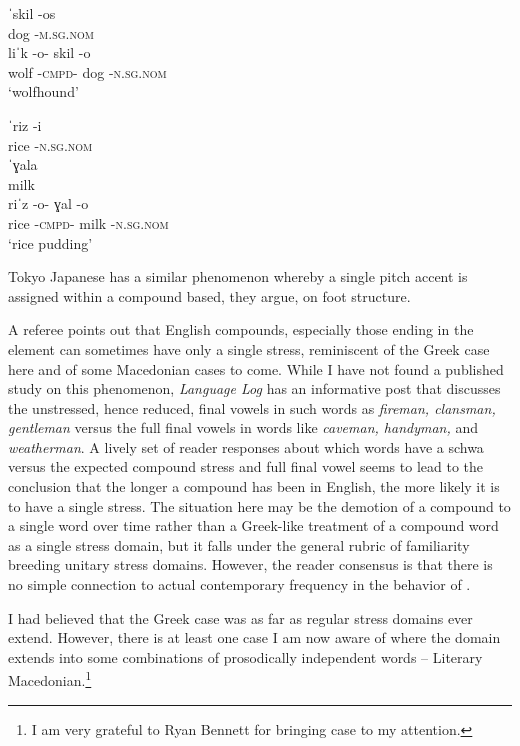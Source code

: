 \documentclass[output=paper,
modfonts
]{LSP/langsci}
\begin{document}
	\ex \gll ˈskil \squish-os\\
	dog \squish-\textsc{m.sg.nom} \\

	\ex \gll liˈk \squish-o- {\squish skil} \squish-o\\
	wolf \squish-\textsc{cmpd-} {\squish dog} \squish\textsc{-n.sg.nom}\\
	\glt ‘wolfhound’

	\ex \gll ˈriz \squish-i \\
	rice \squish-\textsc{n.sg.nom}\\

	\ex \gll ˈɣala\\
	milk \\

	\ex \gll riˈz \squish-o- {\squish ɣal} \squish-o\\
	rice \squish\textsc{-cmpd-} {\squish milk} \squish-\textsc{n.sg.nom} \\
	\glt  ‘rice pudding’
	\z
\z

\noindent Tokyo Japanese \citep{poser1990,kubozono2008} has a similar phenomenon whereby a single pitch accent is assigned within a compound based, they argue, on foot structure. 

A referee points out that English compounds, especially those ending in the element  can sometimes have only a single stress, reminiscent of the Greek case here and of some Macedonian cases to come. While I have not found a published study on this phenomenon, \emph{Language Log} \citep{liberman2015} has an informative post that discusses the unstressed, hence reduced, final vowels in such words as \textit{fireman, clansman, gentleman} versus the full final vowels in words like \textit{caveman, handyman,} and \textit{weatherman}. A lively set of reader responses about which words have a schwa versus the expected compound stress and full final vowel seems to lead to the conclusion that the longer a  compound has been in English, the more likely it is to have a single stress. The situation here may be the demotion of a compound to a single word over time rather than a Greek-like treatment of a compound word as a single stress domain, but it falls under the general rubric of familiarity breeding unitary stress domains. However, the reader consensus is that there is no simple connection to actual contemporary frequency in the behavior of .

I had believed that the Greek case was as far as regular stress domains ever extend. However, there is at least one case I am now aware of where the domain extends into some combinations of prosodically independent words -- Literary Macedonian.\footnote{ I am very grateful to Ryan Bennett for bringing case to my attention.}
\end{document}
